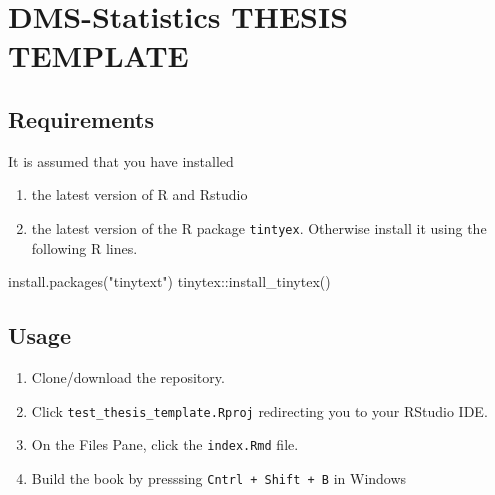 \documentclass{source/tex/templates/maththesis}
\providecommand{\tightlist}{%
  \setlength{\itemsep}{0pt}\setlength{\parskip}{0pt}}
\newenvironment{Shaded}{\begin{snugshade}}{\end{snugshade}}
\newcommand{\FunctionTok}[1]{\textcolor[rgb]{0.00,0.00,0.00}{#1}}
\newcommand{\NormalTok}[1]{#1}
\newcommand{\SpecialCharTok}[1]{\textcolor[rgb]{0.00,0.00,0.00}{#1}}
\newcommand{\StringTok}[1]{\textcolor[rgb]{0.31,0.60,0.02}{#1}}
\begin{document}
\setcounter{page}{1}


\hypertarget{dms-statistics-thesis-template}{%
\section{DMS-Statistics THESIS TEMPLATE}\label{dms-statistics-thesis-template}}

\hypertarget{requirements}{%
\subsection{Requirements}\label{requirements}}

It is assumed that you have installed

\begin{enumerate}
\def\labelenumi{\arabic{enumi}.}
\tightlist
\item
  the latest version of R and Rstudio
\item
  the latest version of the R package \texttt{tintyex}. Otherwise install it using the following R lines.
\end{enumerate}

\begin{Shaded}
\begin{Highlighting}[]
\FunctionTok{install.packages}\NormalTok{(}\StringTok{"tinytext"}\NormalTok{)}
\NormalTok{tinytex}\SpecialCharTok{::}\FunctionTok{install\_tinytex}\NormalTok{()}
\end{Highlighting}
\end{Shaded}

\hypertarget{usage}{%
\subsection{Usage}\label{usage}}

\begin{enumerate}
\def\labelenumi{\arabic{enumi}.}
\tightlist
\item
  Clone/download the repository.
\item
  Click \texttt{test\_thesis\_template.Rproj} redirecting you to your RStudio IDE.
\item
  On the Files Pane, click the \texttt{index.Rmd} file.
\item
  Build the book by presssing \texttt{Cntrl\ +\ Shift\ +\ B} in Windows
\end{enumerate}

\end{document}
